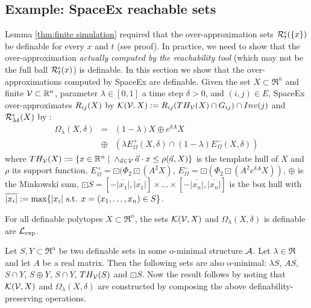 \subsection{Example: SpaceEx reachable sets}
\label{sec:spaceex}
Lemma \ref{thm:finite simulation} required that the over-approximation sets $\mathcal{R}^\epsilon_{t}(\{{x}\})$ be definable for every $x$ and $t$ (see proof).
In practice, we need to show that the over-approximation \emph{actually computed by the reachability tool} (which may not be the full ball $\mathcal{R}^\epsilon_{t}(x)$) is definable.
In this section we show that the over-approximations computed by SpaceEx \cite{FrehseCAV11} are definable.
Given the set $X\subset \Re^n$ and finite $\mathcal{V} \subset \mathbb{R}^n$, parameter $\lambda \in [0,1]$ a time step $\delta>0$, and $(i,j) \in E$, 
SpaceEx over-approximates $R_{ij}(X)$ by $\mathcal{K}(\mathcal{V},X) := R_{ij}(TH_{\mathcal{V}}(X)\cap G_{ij})\cap Inv(j)$ and $\mathcal{R}_{\lambda \delta}^\epsilon(X)$ by \cite{FrehseCAV11}:
\begin{eqnarray}
\Omega_\lambda(X,\delta) &=& (1-\lambda)X \oplus e^{\delta A} X 
\nonumber \\
&\oplus&(\lambda E_\Omega^+(X,\delta) \cap (1-\lambda) E_\Omega^-(X,\delta))
\end{eqnarray}
where
$TH_{\mathcal{V}}(X) := \{x\in\mathbb{R}^n \;|\;\land_{\vec{a} \in \mathcal{V}} \vec{a}\cdot x \leq \rho(\vec{a},X)\}$ is the template hull of $X$ and $\rho$ its support function,
$E_\Omega^+ = \boxdot (\Phi_2 \boxdot(A^2 X)$,
$E_\Omega^- = \boxdot (\Phi_2 \boxdot(A^2 e^{\delta A}X))$,
$\oplus$ is the Minkowski sum,
$\boxdot S =  [-\overline{|x_1|}, \overline{|x_1|} ] \times \ldots \times [-\overline{|x_n|}, \overline{|x_n|} ]$ is the box hull
with $\overline{|x_i|} := \max\{|x_i| \text{ s.t. } x=(x_1,\ldots,x_n) \in S\}$.

\begin{prop}
	\label{prop:spaceex definable}
	For all definable polytopes $X \subset \Re^n$, the sets $\mathcal{K}(\mathcal{V},X)$ and $\Omega_\lambda(X,\delta)$ is definable are $\mathcal{L}_{\exp}$.
\end{prop}
	
\begin{prf}
Let $S, Y \subset \Re^n$ be two definable sets in some o-minimal structure $\mathcal{A}$.
Let $\lambda \in \Re$ and let $A$ be a real matrix.
Then the following sets are also o-minimal: $\lambda S$, $A S$, $S \cap Y$, $S \oplus Y$, $S \cap Y$, $TH_{\mathcal{V}}(S)$ and $\boxdot S$.
Now the result follows by noting that $\mathcal{K}(\mathcal{V},X)$ and $\Omega_\lambda(X,\delta)$ are constructed by composing the above definability-preserving operations.
\end{prf}


